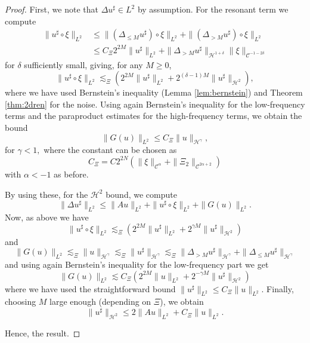 \documentclass[11pt, oneside]{article}   	%
\newcommand{\CC}{\mathscr{C}}
\newcommand{\ssp}{\mathscr{H}}
\begin{document}
\begin{proof}
	

	First, we note that $\Delta u^{\sharp} \in L^2$ by
		assumption. For the resonant term we compute
		\begin{align}
		\| u^{\sharp} \circ \xi \|_{L^2} &\le \| (\Delta_{\le M}
		u^{\sharp}) \circ \xi \|_{L^2} + \| (\Delta_{> M} u^{\sharp}) \circ \xi
		\|_{L^2} \nonumber\\&\le C_{\Xi} 2^{2 M} \| u^{\sharp} \|_{L^2} + \| \Delta_{>
			M} u^{\sharp} \|_{\ssp^{1 + \delta}} \| \xi \|_{\CC^{- 1 - 2\delta}}
		\label{eqn:usharpxi}
		\end{align}
		for $\delta$ sufficiently small, giving, for any $M \ge 0$,
		\[ \| u^{\sharp} \circ \xi \|_{L^2} \lesssim_{\Xi} (2^{2 M} \| u^{\sharp}
		\|_{L^2} + 2^{(\delta - 1) M} \| u^{\sharp} \|_{\ssp^2}), \]
		where we have used Bernstein's inequality (Lemma \ref{lem:bernstein}) and
		Theorem \ref{thm:2dren} for the noise. Using again Bernstein's inequality
		for the low-frequency terms and the paraproduct estimates for the
		high-frequency terms, we obtain the bound
		\[ \| G (u) \|_{L^2} \le C_{\Xi} \| u \|_{\ssp^{\gamma}}, \]
		for $\gamma < 1,$ where the constant can be chosen as
		\[ C_{\Xi} = C 2^{2 N} (\| \xi \|_{\CC^{\alpha}} + \| \Xi_2
		\|_{\CC^{2 \alpha + 2}} ) \]
		with $\alpha < - 1$ as before.
		
		By using these, for the $\ssp^2$ bound, we compute
		\[ \| \Delta u^{\sharp} \|_{L^2} \le \| A u \|_{L^2} + \| u^{\sharp}
		\circ \xi \|_{L^2} + \| G (u) \|_{L^2}. \]
		Now, as above we have
		\[ \| u^{\sharp} \circ \xi \|_{L^2} \lesssim_{\Xi} (2^{2 M} \| u^{\sharp}
		\|_{L^2} + 2^{\gamma M} \| u^{\sharp} \|_{\ssp^2}) \]
		and
		\begin{equation}
		\| G (u) \|_{L^2} \lesssim_{\Xi} \| u \|_{\ssp^{\gamma}} \lesssim_{\Xi}
		\| u^{\sharp} \|_{\ssp^{\gamma}}  \lesssim_\Xi\| \Delta_{> M} u^{\sharp} \|_{\ssp^{\gamma}} + \| \Delta_{\le M} u^{\sharp} \|_{\ssp^{\gamma}}
		\label{eqn:Gubound}
		\end{equation}
		and using again Bernstein's inequality for the low-frequency part we get
		\[ \| G (u) \|_{L^2} \lesssim C_{\Xi} (2^{2 M} \| u \|_{L^2} + 2^{-\gamma M} \| u^{\sharp} \|_{\ssp^2}) \]
		where we have used the straightforward bound
		$\| u^{\sharp} \|_{L^2} \le C_{\Xi} \| u \|_{L^2}$.
		Finally, choosing $M$ large enough (depending on $\Xi$), we obtain
		\[ \| u^{\sharp} \|_{\ssp^2} \le 2 \| A u \|_{L^2} + C_{\Xi} \| u
		\|_{L^2} . \]
		

	Hence, the result.
\end{proof}
\end{document}
